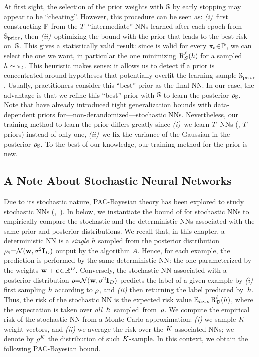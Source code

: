 At first sight, the selection of the prior weights with $\S$ by early stopping may appear to be ``cheating''.
However, this procedure can be seen as: {\it (i)}~first constructing $\priorset$ from the $\iter$ ``intermediate'' NNs learned after each epoch \mbox{from $\S_{\text{prior}}$}, then  {\it (ii)}~optimizing the bound with the prior that leads to the best risk \mbox{on $\S$}.
This gives a statistically valid result: since  is valid for every $\P_\t\!\in\!\priorset$, we can select the one we want, in particular the one minimizing  $\RiskLoss_{\dS}(\h)$ for a sampled $\h\sim\P_\t$.
This heuristic makes sense: it allows us to detect if a prior is concentrated around hypotheses that potentially overfit the learning sample $\S_{\text{prior}}$.
Usually, practitioners consider this ``best'' prior as the final  NN.
In our case, the advantage is that  we refine this ``best'' prior with $\S$ to learn the posterior $ \AQ$.
Note that \citet{PerezOrtizRivasplataShaweTaylorSzepesvari2021} have already  introduced tight generalization bounds with data-dependent priors for---non-derandomized---stochastic  NNs.
Nevertheless, our training method to learn the prior differs greatly since {\it (i)}~we learn $\iter$  NNs (\ie, $\iter$ priors) instead of only one, {\it (ii)}~we fix the variance of the Gaussian in the posterior  $\AQ$.
To the best of our knowledge, our training method for the prior is new.


\subsection{A Note About Stochastic Neural Networks}
Due to its stochastic nature, PAC-Bayesian theory has been explored to study stochastic  NNs (\eg,~\citet{DziugaiteRoy2017, DziugaiteRoy2018, ZhouVeitchAusternAdamsOrbanz2019, PerezOrtizRivasplataShaweTaylorSzepesvari2021}).
In  below, we instantiate the bound of  for stochastic  NNs to empirically compare the stochastic and the deterministic  NNs associated with the same prior and posterior distributions.
We recall that, in this chapter, a deterministic  NN is a \emph{single} $\h$ sampled from the posterior distribution $\AQ{=}\Ncal(\wbf, \sigma^2\Ibf_{D})$ output by the algorithm $A$.
Hence, for each example, the prediction is performed by the same deterministic NN: the one parameterized by the weights $\wbf+\epsilonbf\!\in\! \R^D$.
Conversely, the stochastic  NN associated with a posterior distribution $\Q{=}\Ncal(\wbf, \sigma^2\Ibf_{D})$ predicts the label of a given example by {\it(i)} first sampling $\h$ according to $\Q$, and {\it (ii)} then returning the label predicted \mbox{by $\h$.}
Thus, the risk of the stochastic  NN is the expected risk value $\EE_{\h{\sim}\Q}\RiskLoss_{\D}(\h)$, where the expectation is taken over \mbox{\emph{all} $\h$ sampled from $\Q$}.
We compute the empirical risk of the stochastic  NN from a Monte Carlo approximation:  {\it (i)} we sample $\K$ weight vectors, and {\it (ii)} we average the risk over the $\K$ associated NNs;
we denote by $\Q^\K$ the distribution of such $\K$-sample.
In this context, we obtain the following PAC-Bayesian bound.

